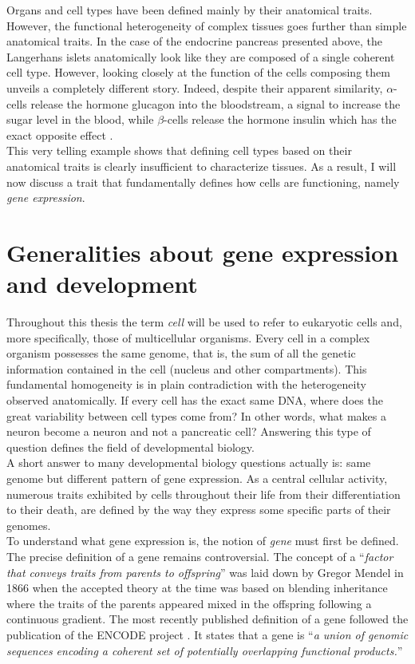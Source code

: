      
    Organs and cell types have been defined mainly by their anatomical traits. However, the functional heterogeneity of complex tissues goes further than simple anatomical traits. In the case of the endocrine pancreas presented above, the Langerhans islets anatomically look like they are composed of a single coherent cell type. However, looking closely at the function of the cells composing them unveils a completely different story. Indeed, despite their apparent similarity, $\alpha$-cells release the hormone glucagon into the bloodstream, a signal to increase the sugar level in the blood, while $\beta$-cells release the hormone insulin which has the exact opposite effect \citep{costanzo06}.\\
     
     This very telling example shows that defining cell types based on their anatomical traits is clearly insufficient to characterize tissues.  As a result, I will now discuss a trait that fundamentally defines how cells are functioning, namely \emph{gene expression}. 

\section{Generalities about gene expression and development}\label{sec:gene_expression_background}     
       
     Throughout this thesis the term \emph{cell} will be used to refer to eukaryotic cells and, more specifically, those of multicellular organisms. Every cell in a complex organism possesses the same genome, that is, the sum of all the genetic information contained in the cell (nucleus and other compartments). This fundamental homogeneity is in plain contradiction with the heterogeneity observed anatomically. If every cell has the exact same DNA, where does the great variability between cell types come from? In other words, what makes a neuron become a neuron and not a pancreatic cell? Answering this type of question defines the field of developmental biology.\\
     
     A short answer to many developmental biology questions actually is: same genome but different pattern of gene expression. As a central cellular activity, numerous traits exhibited by cells throughout their life from their differentiation to their death, are defined by the way they express some specific parts of their genomes.\\

     To understand what gene expression is, the notion of \emph{gene} must first be defined. The precise definition of a gene remains controversial. The concept of a ``\emph{factor that conveys traits from parents to offspring}'' was laid down by Gregor Mendel in 1866 \citep{mendel66} when the accepted theory at the time was based on blending inheritance where the traits of the parents appeared mixed in the offspring following a continuous gradient. The most recently published definition of a gene followed the publication of the ENCODE project \citep{feingold04}. It states that a gene is ``\emph{a union of genomic sequences encoding a coherent set of potentially overlapping functional products.}''\\

